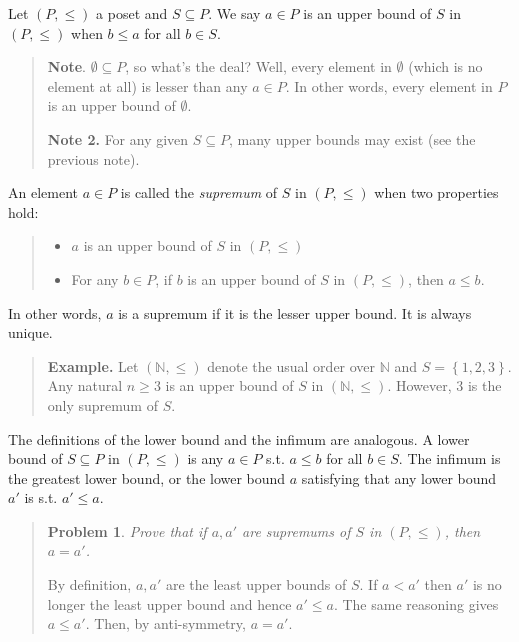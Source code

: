 \documentclass[a4paper, 12pt]{article}
\newtheorem{problem}{Problem}
\newtheorem{problem}{Problem}
\begin{document}
Let $(P, \leq) $ a poset and $S \subseteq P$. We say $a \in P$ is an upper bound
of $S$ in $(P, \leq) $ when $b \leq a$ for all $b \in S$. 

\begin{quote}
    \textbf{Note}. $\emptyset \subseteq P$, so what's the deal? Well, every
    element in $\emptyset$ (which is no element at all) is lesser than any $a
    \in P$. In other words, every element in $P$ is an upper bound of
    $\emptyset$.

    \textbf{Note 2.} For any given $S \subseteq P$, many upper bounds may exist
    (see the previous note).
\end{quote}

An element $a \in P$ is called the \textit{supremum} of $S$ in $(P, \leq) $ when
two properties hold: 

\begin{quote}
\begin{itemize}
    \item $a$ is an upper bound of $S$ in $(P, \leq) $ 
    \item For any $b \in P$, if $b$ is an upper bound of $S$ in $(P, \leq) $,
        then $a \leq b$.
\end{itemize}
\end{quote}

In other words, $a$ is a supremum if it is the lesser upper bound. It is always
unique.


\small
\begin{quote}

    \textbf{Example.} Let $(\mathbb{N}, \leq)$ denote the usual order over
    $\mathbb{N}$ and $S = \left\{ 1, 2, 3 \right\} $. Any natural $n \geq 3$ is an upper
    bound of $S$ in $(\mathbb{N}, \leq)$. However, $3$ is the only supremum of
    $S$.

\end{quote}
\normalsize

The definitions of the lower bound and the infimum are analogous. A lower bound
of $S \subseteq P$ in $(P, \leq) $ is any $a \in P$ s.t. $a \leq b$ for all $b
\in S$. The infimum is the greatest lower bound, or the lower bound $a$
satisfying that any lower bound $a'$ is s.t. $a' \leq a$.


\small
\begin{quote}

\begin{problem}
    Prove that if $a, a'$ are supremums of $S$ in $(P, \leq) $, then $a = a'$.
\end{problem}

By definition, $a, a'$ are the least upper bounds of $S$. If $a < a'$ then $a'$
is no longer the least upper bound and hence $a' \leq a$. The same reasoning
gives $a \leq a'$. Then, by anti-symmetry, $a = a'$.

\end{quote}
\normalsize
\end{document}
